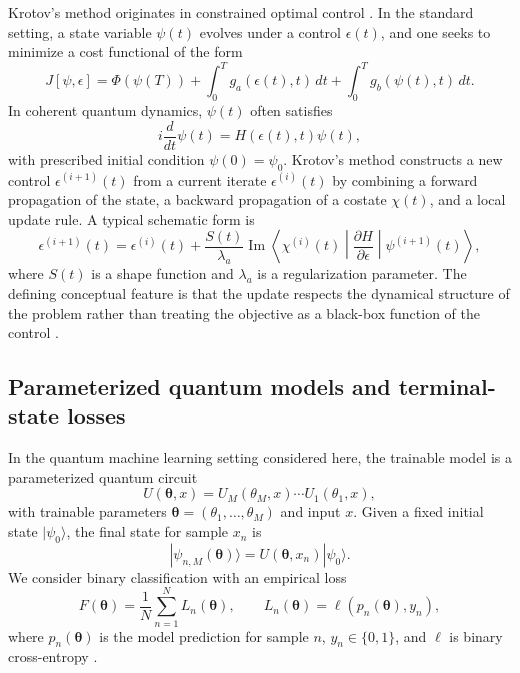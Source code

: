 \documentclass[aps,prb,10pt,twocolumn,superscriptaddress]{revtex4-2}
\begin{document}
Krotov's method originates in constrained optimal control \cite{KonnovKrotov1999}. In the standard setting, a state variable \(\psi(t)\) evolves under a control \(\epsilon(t)\), and one seeks to minimize a cost functional of the form
\begin{equation}
J[\psi,\epsilon]
=
\Phi(\psi(T))
+
\int_0^T g_a(\epsilon(t),t)\,dt
+
\int_0^T g_b(\psi(t),t)\,dt.
\label{eq:generic_cost}
\end{equation}
In coherent quantum dynamics, \(\psi(t)\) often satisfies
\begin{equation}
i \frac{d}{dt}\psi(t)=H(\epsilon(t),t)\psi(t),
\label{eq:schrodinger}
\end{equation}
with prescribed initial condition \(\psi(0)=\psi_0\). Krotov's method constructs a new control \(\epsilon^{(i+1)}(t)\) from a current iterate \(\epsilon^{(i)}(t)\) by combining a forward propagation of the state, a backward propagation of a costate \(\chi(t)\), and a local update rule. A typical schematic form is
\begin{equation}
\epsilon^{(i+1)}(t)
=
\epsilon^{(i)}(t)
+
\frac{S(t)}{\lambda_a}
\operatorname{Im}
\left\langle
\chi^{(i)}(t)
\middle|
\frac{\partial H}{\partial \epsilon}
\middle|
\psi^{(i+1)}(t)
\right\rangle,
\label{eq:krotov_update}
\end{equation}
where \(S(t)\) is a shape function and \(\lambda_a\) is a regularization parameter. The defining conceptual feature is that the update respects the dynamical structure of the problem rather than treating the objective as a black-box function of the control \cite{SklarzTannor2002,PalaoKosloff2003,ReichNdongKoch2012,WerschnikGross2007,BrifChakrabartiRabitz2010}.

\subsection{Parameterized quantum models and terminal-state losses}

In the quantum machine learning setting considered here, the trainable model is a parameterized quantum circuit
\begin{equation}
U(\bm{\theta},x)=U_M(\theta_M,x)\cdots U_1(\theta_1,x),
\label{eq:circuit}
\end{equation}
with trainable parameters \(\bm{\theta}=(\theta_1,\dots,\theta_M)\) and input \(x\). Given a fixed initial state \(|\psi_0\rangle\), the final state for sample \(x_n\) is
\begin{equation}
|\psi_{n,M}(\bm{\theta})\rangle
=
U(\bm{\theta},x_n)|\psi_0\rangle.
\label{eq:final_state}
\end{equation}
We consider binary classification with an empirical loss
\begin{equation}
F(\bm{\theta})=\frac{1}{N}\sum_{n=1}^N L_n(\bm{\theta}),
\qquad
L_n(\bm{\theta})=\ell(p_n(\bm{\theta}),y_n),
\label{eq:empirical_loss}
\end{equation}
where \(p_n(\bm{\theta})\) is the model prediction for sample \(n\), \(y_n\in\{0,1\}\), and \(\ell\) is binary cross-entropy \cite{MitaraiEtAl2018QCL,SchuldEtAl2020CircuitCentric,PerezSalinasEtAl2020DataReupload}.
\end{document}
